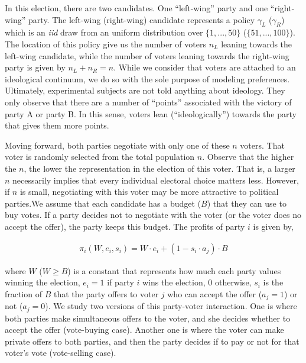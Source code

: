 \documentclass[onesided]{article}\usepackage[]{graphicx}\usepackage[]{color}
\begin{document}
In this election, there are two candidates. One ``left-wing'' party and one ``right-wing'' party. The left-wing (right-wing) candidate represents a policy $\gamma_L$ ($\gamma_R$) which is an \emph{iid} draw from an uniform distribution over $\{1,...,50\}$ ($\{51,...,100\}$). The location of this policy give us the number of voters $n_L$ leaning towards the left-wing candidate, while the number of voters leaning towards the right-wing party is given by $n_L+n_R=n$. While we consider that voters are attached to an ideological continuum, we do so with the sole purpose of modeling preferences. Ultimately, experimental subjects are not told anything about ideology. They only observe that there are a number of ``points'' associated with the victory of party A or party B. In this sense, voters lean (``ideologically'') towards the party that gives them more points.

Moving forward, both parties negotiate with only one of these $n$ voters. That voter is randomly selected from the total population $n$. Observe that the higher the $n$, the lower the representation in the election of this voter. That is, a larger $n$ necessarily implies that every individual electoral choice matters less. {\color{red}However, if $n$ is small, negotiating with this voter may be more attractive to political parties}.We assume that each candidate has a budget ($B$) that they can use to buy votes. If a party decides not to negotiate with the voter (or the voter does no accept the offer), the party keeps this budget. The profits of party $i$ is given by,

\begin{align*}
  \pi_i(W,e_i,s_i)=W\cdot e_i+(1-s_i\cdot a_j )\cdot B
\end{align*}

where $W$ ($W\geq B$) is a constant that represents how much each party values winning the election, $e_i=1$ if party $i$ wins the election, 0 otherwise,  $s_i$ is the fraction of $B$ that the party offers to voter $j$ who can accept the offer ($a_j=1$) or not ($a_j=0$). We study two versions of this party-voter interaction. One is where both parties make simultaneous offers to the voter, and she decides whether to accept the offer (vote-buying case). Another one is where the voter can make private offers to both parties, and then the party decides if to pay or not for that voter's vote (vote-selling case).
\end{document}
